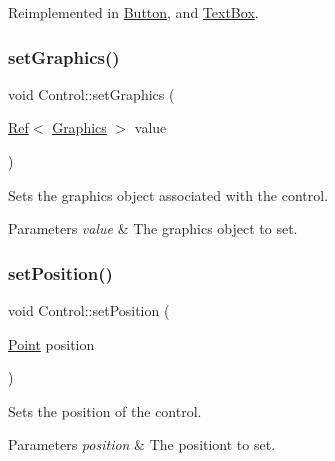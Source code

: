 Reimplemented in \mbox{\hyperlink{class_button_ac80b96f804bcb1a8cdf1b8617be02c55}{Button}}, and \mbox{\hyperlink{class_text_box_aab9c57dae96c908b9b3a4f03b837a9fe}{Text\+Box}}.

\mbox{\label{class_control_a2cfc3f0fc6c83e80d4e083d5b50fe3ef}} 
\subsubsection{\texorpdfstring{setGraphics()}{setGraphics()}}
{\footnotesize\ttfamily void Control\+::set\+Graphics (\begin{DoxyParamCaption}\item[{\mbox{\hyperlink{class_ref}{Ref}}$<$ \mbox{\hyperlink{class_graphics}{Graphics}} $>$}]{value }\end{DoxyParamCaption})}



Sets the graphics object associated with the control. 


\begin{DoxyParams}{Parameters}
{\em value} & The graphics object to set.\\
\hline
\end{DoxyParams}
\mbox{\label{class_control_a3a758dd5d74b1e8d6373c0c514a9613c}} 
\subsubsection{\texorpdfstring{setPosition()}{setPosition()}}
{\footnotesize\ttfamily void Control\+::set\+Position (\begin{DoxyParamCaption}\item[{\mbox{\hyperlink{struct_point}{Point}}}]{position }\end{DoxyParamCaption})}



Sets the position of the control. 


\begin{DoxyParams}{Parameters}
{\em position} & The positiont to set.\\
\hline
\end{DoxyParams}
\mbox{\label{class_control_a73b8872a110ebdea56f9d5a04d115455}} 
